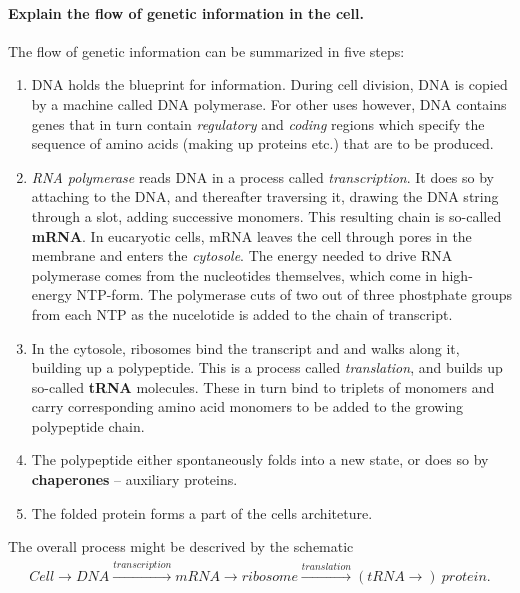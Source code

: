 \documentclass[a4paper,12pt]{article}
\begin{document}
      \paragraph{Explain the flow of genetic information in the cell.\\}
         The flow of genetic information can be summarized in five steps:
         \begin{enumerate}
            \item DNA holds the blueprint for information. During cell division,
               DNA is copied by a machine called DNA polymerase. For other uses
               however, DNA contains genes that in turn contain
               \emph{regulatory} and \emph{coding} regions which specify the
               sequence of amino acids (making up proteins etc.) that are to be 
               produced. 
            \item \emph{RNA polymerase} reads DNA in a process called
               \emph{transcription}. It does so by attaching to the DNA, and
               thereafter traversing it, drawing the DNA string through a slot,
               adding successive monomers. This resulting chain is so-called
               \textbf{mRNA}. In eucaryotic cells, mRNA leaves the cell through
               pores in the membrane and enters the \emph{cytosole}. The energy
               needed to drive RNA polymerase comes from the nucleotides
               themselves, which come in high-energy NTP-form. The polymerase
               cuts of two out of three phostphate groups from each NTP as the
               nucelotide is added to the chain of transcript.
            \item In the cytosole, ribosomes bind the transcript and and walks
               along it, building up a polypeptide. This is a process called
               \emph{translation}, and builds up so-called \textbf{tRNA}
               molecules. These in turn bind to triplets of monomers and carry
               corresponding amino acid monomers to be added to the growing
               polypeptide chain. 

            \item The polypeptide either spontaneously folds into a new state,
               or does so by \textbf{chaperones} -- auxiliary proteins. 

            \item The folded protein forms a part of the cells architeture. 
         \end{enumerate}
         The overall process might be descrived by the schematic
         \begin{align*}
            Cell \rightarrow DNA \xrightarrow{transcription} mRNA \rightarrow
            ribosome \xrightarrow{translation} (tRNA \rightarrow)~protein.
         \end{align*}
               
\end{document}
